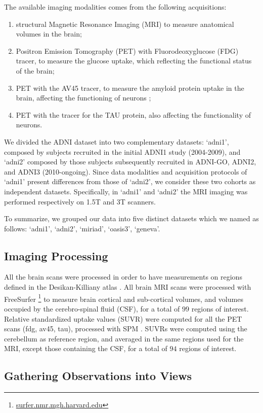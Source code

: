 The available imaging modalities comes from the following acquisitions:
%
\begin{enumerate}
\item structural Magnetic Resonance Imaging (MRI) to measure anatomical volumes in the brain;
%
\item Positron Emission Tomography (PET) with Fluorodeoxyglucose (FDG) tracer, to measure the glucose uptake, which reflecting the functional status of the brain;
\item PET with the AV45 tracer, to measure the amyloid protein uptake in the brain, affecting the functioning of neurons ;
\item PET with the tracer for the TAU protein, also affecting the functionality of neurons.
\end{enumerate}
%

We divided the ADNI dataset into two complementary datasets:
`adni1', composed by subjects recruited in the initial ADNI1 study (2004-2009),
and `adni2' composed by those subjects subsequently recruited in ADNI-GO, ADNI2, and ADNI3 (2010-ongoing).
Since data modalities and acquisition protocols of `adni1' present differences from those of `adni2', we consider these two cohorts as independent datasets.
Specifically, in `adni1' and `adni2' the MRI imaging was performed respectively on 1.5T and 3T scanners.

To summarize, we grouped our data into five distinct datasets which we named as follows: `adni1', `adni2', `miriad', `oasis3', `geneva'.

\subsection{Imaging Processing}
All the brain scans were processed in order to have measurements on regions defined in the Desikan-Killiany atlas \citep{Desikan2006}.
All brain MRI scans were processed with FreeSurfer \footnote{\href{https://surfer.nmr.mgh.harvard.edu/}{surfer.nmr.mgh.harvard.edu}} \citep{freesurfer} to measure brain cortical and sub-cortical volumes, and volumes occupied by the cerebro-spinal fluid (CSF), for a total of $99$ regions of interest.
Relative standardized uptake values (SUVR) were computed for all the PET scans (fdg, av45, tau), processed with SPM \citep{Ashburner2000}.
SUVRs were computed using the cerebellum as reference region, and averaged in the same regions used for the MRI, except those containing the CSF, for a total of $94$ regions of interest.

\subsection{Gathering Observations into Views}
\label{ssec:views}


